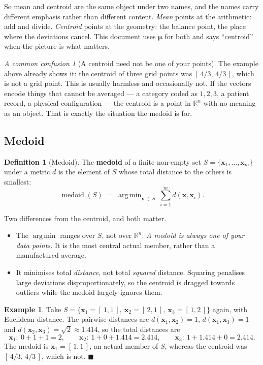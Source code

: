 \documentclass[11pt]{article}
\theoremstyle{plain}
\theoremstyle{definition}
\newtheorem{defn}{Definition}[section]
\newtheorem{ex}{Example}[section]
\theoremstyle{remark}
\newtheorem*{warn}{A common confusion}
\newcommand{\R}{\mathbb{R}}
\newcommand{\vc}[1]{\mathbf{#1}}
\newcommand{\bmu}{\boldsymbol{\mu}}
\DeclareMathOperator*{\argmin}{arg\,min}
\begin{document}
\noindent So mean and centroid are the same object under two names, and the
names carry different emphasis rather than different content. \emph{Mean} points
at the arithmetic: add and divide. \emph{Centroid} points at the geometry: the
balance point, the place where the deviations cancel. This document uses
$\bmu$ for both and says ``centroid'' when the picture is what matters.

\begin{warn}[A centroid need not be one of your points]
The example above already shows it: the centroid of three grid points was
$[\,4/3,\,4/3\,]$, which is not a grid point. This is usually harmless and
occasionally not. If the vectors encode things that cannot be averaged --- a
category coded as $1,2,3$, a patient record, a physical configuration --- the
centroid is a point in $\R^{n}$ with no meaning as an object. That is exactly
the situation the medoid is for.
\end{warn}

\subsection{Medoid}
\begin{defn}[Medoid]
The \textbf{medoid} of a finite non-empty set $S=\{\vc{x}_1,\dots,\vc{x}_m\}$
under a metric $d$ is the element of $S$ whose total distance to the others is
smallest:
\[
  \operatorname{medoid}(S)
  \;=\; \argmin_{\vc{x}\,\in\,S}\ \sum_{i=1}^{m} d(\vc{x},\vc{x}_i) .
\]
\end{defn}

\noindent Two differences from the centroid, and both matter.

\begin{itemize}[leftmargin=1.4em,itemsep=4pt]
  \item The $\argmin$ ranges over $S$, not over $\R^{n}$. \emph{A medoid is
        always one of your data points.} It is the most central actual member,
        rather than a manufactured average.
  \item It minimises total \emph{distance}, not total \emph{squared} distance.
        Squaring penalises large deviations disproportionately, so the centroid
        is dragged towards outliers while the medoid largely ignores them.
\end{itemize}

\begin{ex}
Take $S=\{\vc{x}_1=[\,1,1\,],\ \vc{x}_2=[\,2,1\,],\ \vc{x}_3=[\,1,2\,]\}$ again,
with Euclidean distance. The pairwise distances are
$d(\vc{x}_1,\vc{x}_2)=1$, $d(\vc{x}_1,\vc{x}_3)=1$ and
$d(\vc{x}_2,\vc{x}_3)=\sqrt2\approx1.414$, so the total distances are
\[
  \vc{x}_1:\ 0+1+1 = 2,
  \qquad
  \vc{x}_2:\ 1+0+1.414 = 2.414,
  \qquad
  \vc{x}_3:\ 1+1.414+0 = 2.414 .
\]
The medoid is $\vc{x}_1=[\,1,1\,]$, an actual member of $S$, whereas the
centroid was $[\,4/3,\,4/3\,]$, which is not. \hfill$\blacksquare$
\end{ex}
\end{document}
